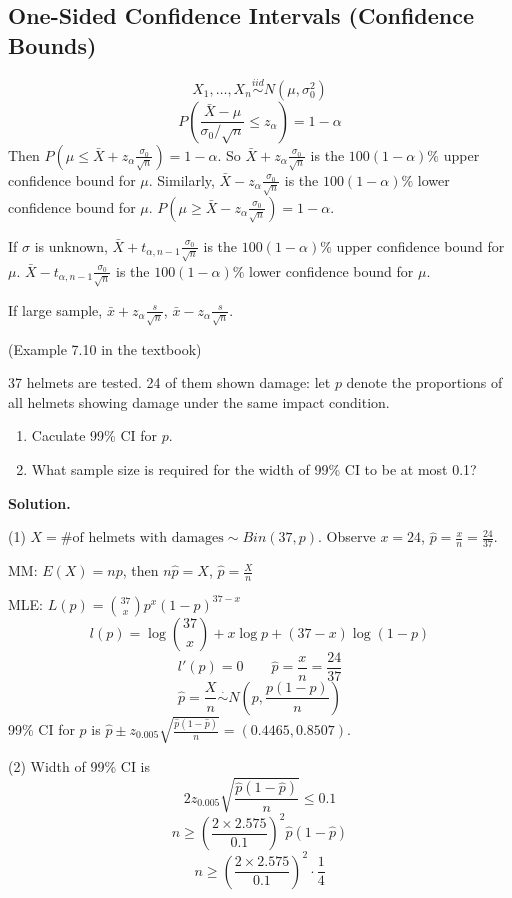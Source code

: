 \subsection{One-Sided Confidence Intervals (Confidence Bounds)}
\[X_1,\dots,X_n \overset{iid}{\sim} N(\mu,\sigma_0^2)\]
\[P\left(\frac{\bar{X}-\mu}{\sigma_0/\sqrt{n}} \leq z_{\alpha}\right)=1-\alpha\]
Then $P\left(\mu\leq \bar{X}+z_{\alpha}\frac{\sigma_0}{\sqrt{n}}\right)=1-\alpha$. So $\bar{X}+z_{\alpha}\frac{\sigma_0}{\sqrt{n}}$ is the $100(1-\alpha)\%$ upper confidence bound for $\mu$. Similarly, $\bar{X}-z_{\alpha}\frac{\sigma_0}{\sqrt{n}}$ is the $100(1-\alpha)\%$ lower confidence bound for $\mu$. $P\left(\mu\geq \bar{X}-z_{\alpha}\frac{\sigma_0}{\sqrt{n}}\right)=1-\alpha$.

If $\sigma$ is unknown, $\bar{X}+t_{\alpha,n-1}\frac{\sigma_0}{\sqrt{n}}$ is the $100(1-\alpha)\%$ upper confidence bound for $\mu$. $\bar{X}-t_{\alpha,n-1}\frac{\sigma_0}{\sqrt{n}}$ is the $100(1-\alpha)\%$ lower confidence bound for $\mu$.

If large sample, $\bar{x}+z_{\alpha}\frac{s}{\sqrt{n}}$, $\bar{x}-z_{\alpha}\frac{s}{\sqrt{n}}$.

\begin{exmp}
(Example 7.10 in the textbook)
\end{exmp}

\begin{exmp}
37 helmets are tested. 24 of them shown damage: let $p$ denote the proportions of all helmets showing damage under the same impact condition.
\begin{enumerate}
\item Caculate 99\% CI for $p$.
\item What sample size is required for the width of 99\% CI to be at most 0.1?
\end{enumerate}
\textbf{Solution.}

(1) $X=\text{\# of helmets with damages}\sim Bin(37,p)$.
Observe $x=24$, $\hat{p}=\frac{x}{n}=\frac{24}{37}$.

MM: $E(X)=np$, then $n\hat{p}=X$, $\hat{p}=\frac{X}{n}$

MLE: $L(p)= \binom {37}{x} p^x (1-p)^{37-x}$
\[l(p)=\log{\binom {37}{x}}+x \log{p}+(37-x)\log{(1-p)}\]
\[l'(p)=0 \qquad \hat{p}=\frac{x}{n}=\frac{24}{37}\]
\[\hat{p}=\frac{X}{n}\overset{\cdot}{\sim} N\left(p,\frac{p(1-p)}{n}\right)\]
99\% CI for $p$ is $\hat{p} \pm  z_{0.005} \sqrt{\frac{\hat{p}(1-\hat{p})}{n} }=(0.4465,0.8507)$.

(2) Width of 99\% CI is 
\[2 z_{0.005} \sqrt{\frac{\hat{p}(1-\hat{p})}{n} } \leq 0.1\]
\[n \geq \left(\frac{2\times 2.575}{0.1}\right)^2 \hat{p}(1-\hat{p})\]
\[n\geq \left(\frac{2\times 2.575}{0.1}\right)^2 \cdot\frac{1}{4}\]
\end{exmp}

